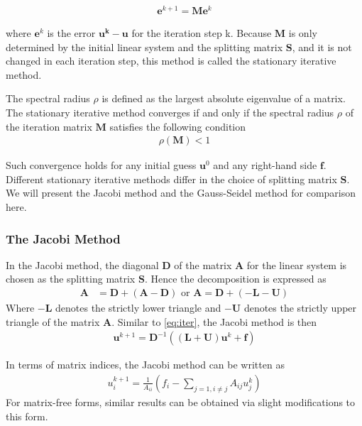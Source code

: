 \begin{align}
    \boldsymbol{e}^{k+1} = \boldsymbol{M} \boldsymbol{e}^k
\end{align}

where $\boldsymbol{e}^k$ is the error $\boldsymbol{u^k} - \boldsymbol{u}$ for the iteration step k. Because $\boldsymbol{M}$ is only determined by the initial linear system and the splitting matrix $\boldsymbol{S}$, and it is not changed in each iteration step, this method is called the stationary iterative method. 

The spectral radius $\rho$ is defined as the largest absolute eigenvalue of a matrix. The stationary iterative method converges if and only if the spectral radius $\rho$ of the iteration matrix $\boldsymbol{M}$ satisfies the following condition
\begin{align}
    \rho(\boldsymbol{M}) < 1
\end{align}

Such convergence holds for any initial guess $\boldsymbol{u}^0$ and any right-hand side $\boldsymbol{f}$. Different stationary iterative methods differ in the choice of splitting matrix $\boldsymbol{S}$. We will present the Jacobi method and the Gauss-Seidel method for comparison here.


\subsubsection{The Jacobi Method}
In the Jacobi method, the diagonal $\boldsymbol{D}$ of the matrix $\boldsymbol{A}$ for the linear system is chosen as the splitting matrix $\boldsymbol{S}$. Hence the decomposition is expressed as
\begin{align}
    \boldsymbol{A} &= \boldsymbol{D} + (\boldsymbol{A} - \boldsymbol{D})  \text{ or } \boldsymbol{A} = \boldsymbol{D} + (-\boldsymbol{L} - \boldsymbol{U})
\end{align}
Where $-\boldsymbol{L}$ denotes the strictly lower triangle and $-\boldsymbol{U}$ denotes the strictly upper triangle of the matrix $\boldsymbol{A}$. Similar to \autoref{eq:iter}, the Jacobi method is then
\begin{align}
    \boldsymbol{u}^{k+1} = \boldsymbol{D}^{-1}((\boldsymbol{L} + \boldsymbol{U})\boldsymbol{u}^k + \boldsymbol{f})
\end{align}

In terms of matrix indices, the Jacobi method can be written as 
\begin{align}
    u_i^{k+1} = \frac{1}{A_{ii}} (f_i - \sum_{j=1,i\neq j}A_{ij}u_j^k)
\end{align}
For matrix-free forms, similar results can be obtained via slight modifications to this form.

